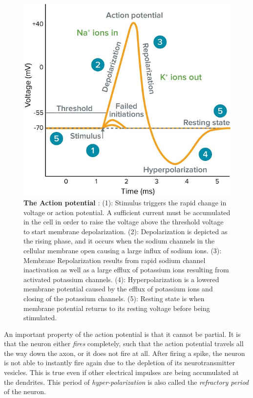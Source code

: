 \begin{figure}[ht!]
  \centering
  \includegraphics[width=0.6\linewidth]{src/pic/what-is-action-potential.jpg}
  \caption{\textbf{The Action potential \citep[taken from][]{what-action-potential}}: (1): Stimulus triggers the rapid change in voltage or action potential. A sufficient current must be accumulated in the cell in order to raise the voltage above the threshold voltage to start membrane depolarization. (2): Depolarization is depicted as the rising phase, and it occurs when the sodium channels in the cellular membrane open causing a large influx of sodium ions. (3): Membrane Repolarization results from rapid sodium channel inactivation as well as a large efflux of potassium ions resulting from activated potassium channels. (4): Hyperpolarization is a lowered membrane potential caused by the efflux of potassium ions and closing of the potassium channels. (5): Resting state is when membrane potential returns to its resting voltage before being stimulated.}
  \label{fig:action_potential}
\end{figure}

An important property of the action potential is that it cannot be partial. It is that the neuron either \emph{fires} completely, such that the action potential travels all the way down the axon, or it does not fire at all. After firing a spike, the neuron is not able to instantly fire again due to the depletion of its neurotransmitter vesicles. This is true even if other electrical impulses are being accumulated at the dendrites. This period of \emph{hyper-polarization} is also called the \emph{refractory period} of the neuron.

